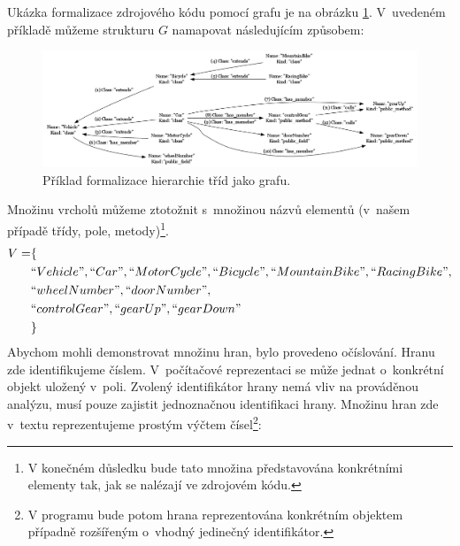 Ukázka formalizace zdrojového kódu pomocí grafu je na obrázku \ref{design-graph_example}. V~uvedeném příkladě můžeme strukturu $G$ namapovat následujícím způsobem:
\begin{figure}[h!]
  \centering
  \includegraphics[width=1.0\textwidth]{./graphs/graph_example.png}
  \caption{Příklad formalizace hierarchie tříd jako grafu.\label{design-graph_example}}
\end{figure}
Množinu vrcholů můžeme ztotožnit s~množinou názvů elementů (v~našem případě třídy, pole, metody)\footnote{V konečném důsledku bude tato množina představována konkrétními elementy tak, jak se nalézají ve zdrojovém kódu.}.
\begin{align*}
  V = &\{ \\
  &``Vehicle", ``Car", ``MotorCycle", ``Bicycle", ``MountainBike", ``RacingBike", \\
  &``wheelNumber", ``doorNumber", \\
  &``controlGear", ``gearUp", ``gearDown" \\
  &\}
\end{align*}
Abychom mohli demonstrovat množinu hran, bylo provedeno očíslování. Hranu zde identifikujeme číslem. V~počítačové reprezentaci se může jednat o~konkrétní objekt uložený v~poli. Zvolený identifikátor hrany nemá vliv na prováděnou analýzu, musí pouze zajistit jednoznačnou identifikaci hrany. Množinu hran zde v~textu reprezentujeme prostým výčtem čísel\footnote{V programu bude potom hrana reprezentována konkrétním objektem případně rozšířeným o~vhodný jedinečný identifikátor.}:

